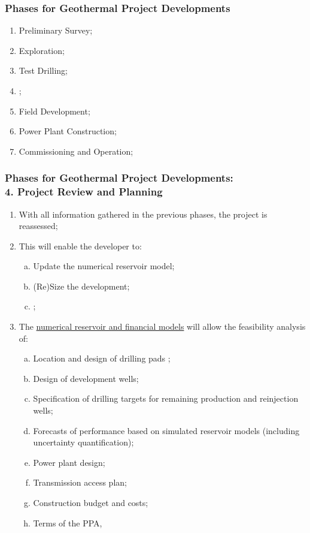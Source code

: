 \documentclass[10pt,compress,unknownkeysallowed]{beamer}
\begin{document}
\begin{frame}
 \frametitle{Phases for Geothermal Project Developments} 
    \begin{enumerate}[1.]
       \item <1-> Preliminary Survey;
       \item <1-> Exploration; 
       \item <1-> Test Drilling;
       \item <2-> ;
       \item <1-> Field Development; 
       \item <1-> Power Plant Construction;
       \item <1-> Commissioning and Operation;
    \end{enumerate}
\end{frame}


\begin{frame}
 \frametitle{Phases for Geothermal Project Developments: \\ 4. Project Review and Planning}
    \begin{enumerate}[{4.}1]\scriptsize
       \item <1-> With all information gathered in the previous phases, the project is reassessed;
       \item <2-> This will enable the developer to:
          \begin{enumerate}[(a)]\scriptsize
             \item<2-> Update the numerical reservoir model;
             \item<2-> (Re)Size the development;
             \item<2-> ;
          \end{enumerate}
       \item <3-> The  \underline{numerical reservoir and financial models} will allow the feasibility analysis of:
          \begin{enumerate}[(a)]\scriptsize
             \item<3-> Location and design of drilling pads ;
             \item<3-> Design of development wells;
             \item<3-> Specification of drilling targets for remaining production and reinjection wells;
             \item<3-> Forecasts of performance based on simulated reservoir models (including uncertainty quantification);
             \item<3-> Power plant design;
             \item<3-> Transmission access plan;
             \item<3-> Construction budget and costs;
             \item<3-> Terms of the PPA, 
          \end{enumerate}
    \end{enumerate}
\end{frame}
 
\end{document}
